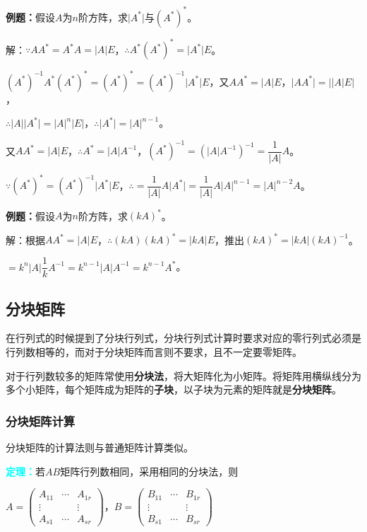 \documentclass[UTF8, 12pt]{ctexart}
\begin{document}
\textbf{例题：}假设$A$为$n$阶方阵，求$\vert A^*\vert$与$(A^*)^*$。

解：$\because AA^*=A^*A=\vert A\vert E$，$\therefore A^*(A^*)^*=\vert A^*\vert E$。

$(A^*)^{-1}A^*(A^*)^*=(A^*)^*=(A^*)^{-1}\vert A^*\vert E$，又$AA^*=\vert A\vert E$，$\vert AA^*\vert=\vert\vert A\vert E\vert$，

$\therefore\vert A\vert\vert A^*\vert=\vert A\vert^n\vert E\vert$，$\therefore\vert A^*\vert=\vert A\vert^{n-1}$。

又$AA^*=\vert A\vert E$，$\therefore A^*=\vert A\vert A^{-1}$，$(A^*)^{-1}=(\vert A\vert A^{-1})^{-1}=\dfrac{1}{\vert A\vert}A$。

$\because(A^*)^*=(A^*)^{-1}\vert A^*\vert E$，$\therefore=\dfrac{1}{\vert A\vert}A\vert A^*\vert=\dfrac{1}{\vert A\vert}A\vert A\vert^{n-1}=\vert A\vert^{n-2}A$。

\textbf{例题：}假设$A$为$n$阶方阵，求$(kA)^*$。

解：根据$AA^*=\vert A\vert E$，$\therefore (kA)(kA)^*=\vert kA\vert E$，推出$(kA)^*=\vert kA\vert(kA)^{-1}$。

$=k^n\vert A\vert\dfrac{1}{k}A^{-1}=k^{n-1}\vert A\vert A^{-1}=k^{n-1}A^*$。

\subsection{分块矩阵}

在行列式的时候提到了分块行列式，分块行列式计算时要求对应的零行列式必须是行列数相等的，而对于分块矩阵而言则不要求，且不一定要零矩阵。

对于行列数较多的矩阵常使用\textbf{分块法}，将大矩阵化为小矩阵。将矩阵用横纵线分为多个小矩阵，每个矩阵成为矩阵的\textbf{子块}，以子块为元素的矩阵就是\textbf{分块矩阵}。

\subsubsection{分块矩阵计算}

分块矩阵的计算法则与普通矩阵计算类似。

\textcolor{aqua}{\textbf{定理：}}若$AB$矩阵行列数相同，采用相同的分块法，则 \medskip

$A=\left(
    \begin{array}{ccc}
        A_{11} & \cdots & A_{1r} \\
        \vdots & & \vdots \\
        A_{s1} & \cdots & A_{sr}
    \end{array}
\right)\text{，}B=\left(
    \begin{array}{ccc}
        B_{11} & \cdots & B_{1r} \\
        \vdots & & \vdots \\
        B_{s1} & \cdots & B_{sr}
    \end{array}
\right)$
\end{document}
